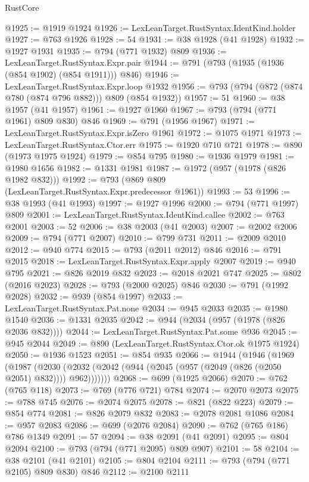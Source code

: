 \begin{lexlean}{RustCore}
\begin{coremodule}
@1925 := @1919 @1924
@1926 := LexLeanTarget.RustSyntax.IdentKind.holder
@1927 := @763 @1926
@1928 := 54
@1931 := @38 @1928 (@41 @1928)
@1932 := @1927 @1931
@1935 := @794 (@771 @1932) @809
@1936 := LexLeanTarget.RustSyntax.Expr.pair
@1944 := @791 (@793 (@1935 (@1936 (@854 @1902) (@854 @1911))) @846)
@1946 := LexLeanTarget.RustSyntax.Expr.loop @1932
@1956 := @793 (@794 (@872 (@874 @780 (@874 @796 @882))) @809 (@854 @1932))
@1957 := 51
@1960 := @38 @1957 (@41 @1957)
@1961 := @1927 @1960
@1967 := @793 (@794 (@771 @1961) @809 @830) @846
@1969 := @791 (@1956 @1967)
@1971 := LexLeanTarget.RustSyntax.Expr.isZero @1961
@1972 := @1075 @1971
@1973 := LexLeanTarget.RustSyntax.Ctor.err
@1975 := @1920 @710 @721
@1978 := @890 (@1973 @1975 @1924)
@1979 := @854 @795
@1980 := @1936 @1979
@1981 := @1980 @1656
@1982 := @1331 @1981
@1987 := @1972 (@957 (@1978 (@826 @1982 @832)))
@1992 := @793 (@869 @809 (LexLeanTarget.RustSyntax.Expr.predecessor @1961))
@1993 := 53
@1996 := @38 @1993 (@41 @1993)
@1997 := @1927 @1996
@2000 := @794 (@771 @1997) @809
@2001 := LexLeanTarget.RustSyntax.IdentKind.callee
@2002 := @763 @2001
@2003 := 52
@2006 := @38 @2003 (@41 @2003)
@2007 := @2002 @2006
@2009 := @794 (@771 @2007)
@2010 := @799 @731
@2011 := @2009 @2010
@2012 := @940 @774
@2015 := @793 (@2011 @2012) @846
@2016 := @791 @2015
@2018 := LexLeanTarget.RustSyntax.Expr.apply @2007
@2019 := @940 @795
@2021 := @826 @2019 @832
@2023 := @2018 @2021 @747
@2025 := @802 (@2016 @2023)
@2028 := @793 (@2000 @2025) @846
@2030 := @791 (@1992 @2028)
@2032 := @939 (@854 @1997)
@2033 := LexLeanTarget.RustSyntax.Pat.none
@2034 := @945 @2033
@2035 := @1980 @1540
@2036 := @1331 @2035
@2042 := @944 (@2034 (@957 (@1978 (@826 @2036 @832))))
@2044 := LexLeanTarget.RustSyntax.Pat.some @936
@2045 := @945 @2044
@2049 := @890 (LexLeanTarget.RustSyntax.Ctor.ok @1975 @1924)
@2050 := @1936 @1523
@2051 := @854 @935
@2066 := @1944
    (@1946
      (@1969
        (@1987
          (@2030 (@2032 (@2042 (@944 (@2045 (@957 (@2049 (@826 (@2050 @2051) @832)))) @962)))))))
@2068 := @699 (@1925 @2066)
@2070 := @762 (@765 @118)
@2073 := @769 (@776 @721) @784
@2074 := @2070 @2073
@2075 := @788 @745
@2076 := @2074 @2075
@2078 := @821 (@822 @223)
@2079 := @854 @774
@2081 := @826 @2079 @832
@2083 := @2078 @2081 @1086
@2084 := @957 @2083
@2086 := @699 (@2076 @2084)
@2090 := @762 (@765 @186) @786 @1349
@2091 := 57
@2094 := @38 @2091 (@41 @2091)
@2095 := @804 @2094
@2100 := @793 (@794 (@771 @2095) @809 @907)
@2101 := 58
@2104 := @38 @2101 (@41 @2101)
@2105 := @804 @2104
@2111 := @793 (@794 (@771 @2105) @809 @830) @846
@2112 := @2100 @2111

\end{coremodule}
\end{lexlean}

